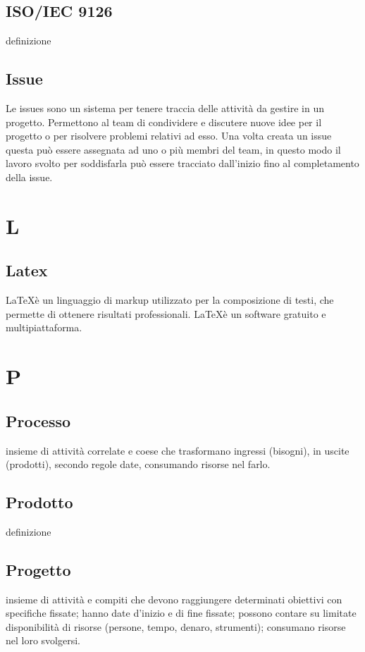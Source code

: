 \documentclass[11pt,a4paper]{article}
\begin{document}
	\subsection{ISO/IEC 9126}
	definizione
	\subsection{Issue}
	Le issues sono un sistema per tenere traccia delle attività da gestire in un progetto. Permettono al team di condividere e discutere nuove idee per il progetto o per risolvere problemi relativi ad esso. Una volta creata un issue questa può essere assegnata ad uno o più membri del team, in questo modo il lavoro svolto per soddisfarla può essere tracciato dall'inizio fino al completamento della issue.
	\section{L}
	\subsection{Latex}
	\LaTeX è un linguaggio di markup utilizzato per la composizione di testi, che permette di ottenere risultati professionali. \LaTeX è un software gratuito e multipiattaforma.
	\section{P}
	\subsection{Processo}
	insieme di attività correlate e coese che trasformano ingressi (bisogni), in uscite (prodotti), secondo regole date, consumando risorse nel farlo.
	\subsection{Prodotto}
	definizione
	\subsection{Progetto}
	insieme di attività e compiti che devono raggiungere determinati
obiettivi con specifiche fissate; hanno date d’inizio e di fine fissate; possono
contare su limitate disponibilità di risorse (persone, tempo, denaro, strumenti); consumano risorse nel loro svolgersi.
\end{document}
